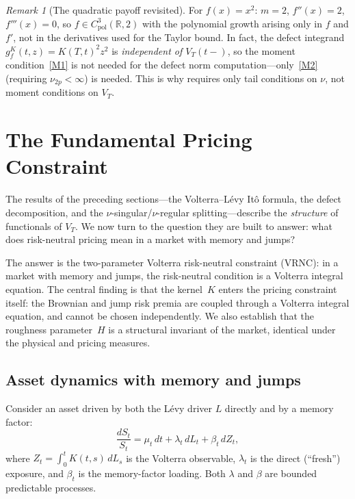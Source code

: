 \documentclass[11pt,a4paper]{article}
\theoremstyle{plain}
\theoremstyle{definition}
\theoremstyle{remark}
\newtheorem{remark}[theorem]{Remark}
\newcommand{\R}{\mathbb{R}}
\begin{document}
\begin{remark}[The quadratic payoff revisited]
\label{rem:quadratic-revisited}
For $f(x) = x^2$: $m = 2$, $f''(x) = 2$, $f'''(x) = 0$,
so $f \in C_{\mathrm{pol}}^3(\R, 2)$ with the polynomial
growth arising only in $f$ and $f'$, not in the derivatives
used for the Taylor bound.  In fact, the defect integrand
$g_f^K(t,z) = K(T,t)^2 z^2$ is \emph{independent of
$V_T(t\!-\!)$}, so the moment condition~\ref{M1} is not
needed for the defect norm computation---only~\ref{M2}
(requiring $\nu_{2p} < \infty$) is needed.  This is why
 requires only tail conditions on $\nu$,
not moment conditions on $V_T$.
\end{remark}


\section{The Fundamental Pricing Constraint}\label{sec:pricing}

The results of the preceding sections---the Volterra--L\'evy
It\^o formula, the defect decomposition, and the
$\nu$-singular/$\nu$-regular splitting---describe the
\emph{structure} of functionals of $V_T$.  We now turn to
the question they are built to answer: what does risk-neutral
pricing mean in a market with memory and jumps?

The answer is the two-parameter Volterra risk-neutral
constraint (VRNC): in a market with memory and jumps, the
risk-neutral condition is a Volterra integral equation.  The
central finding is that the kernel~$K$ enters the pricing
constraint itself: the Brownian and jump risk premia are
coupled through a Volterra integral equation, and cannot
be chosen independently.  We also establish that the
roughness parameter~$H$ is a structural invariant of the
market, identical under the physical and pricing measures.

\subsection{Asset dynamics with memory and jumps}

Consider an asset driven by both the L\'evy driver $L$ directly
and by a memory factor:
\begin{equation}\label{eq:asset-VL}
  \frac{dS_t}{S_t} = \mu_t\,dt + \lambda_t\,dL_t
  + \beta_t\,dZ_t,
\end{equation}
where $Z_t = \int_0^t K(t,s)\,dL_s$ is the Volterra observable,
$\lambda_t$ is the direct (``fresh'') exposure, and $\beta_t$ is
the memory-factor loading.  Both $\lambda$ and $\beta$ are bounded
predictable processes.
\end{document}
